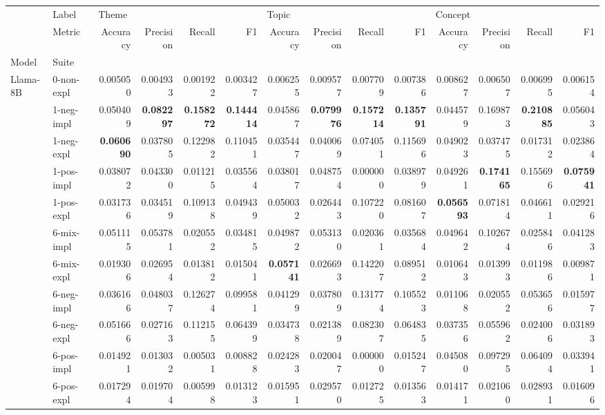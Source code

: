 \begin{tabular}{ll|rrrr|rrrr|rrrr}
 & Label & \multicolumn{4}{l}{Theme} & \multicolumn{4}{l}{Topic} & \multicolumn{4}{l}{Concept} \\
 & Metric & Accuracy & Precision & Recall & F1 & Accuracy & Precision & Recall & F1 & Accuracy & Precision & Recall & F1 \\
Model & Suite &  &  &  &  &  &  &  &  &  &  &  &  \\
\midrule
\multirow[c]{11}{*}{Llama-8B} & 0-non-expl & 0.005050 & 0.004933 & 0.001922 & 0.003427 & 0.006255 & 0.009577 & 0.007709 & 0.007386 & 0.008627 & 0.006507 & 0.006995 & 0.006154 \\
 & 1-neg-impl & 0.050409 & \bfseries 0.082297 & \bfseries 0.158272 & \bfseries 0.144414 & 0.045867 & \bfseries 0.079976 & \bfseries 0.157214 & \bfseries 0.135791 & 0.044579 & 0.169873 & \bfseries 0.210885 & 0.056043 \\
 & 1-neg-expl & \bfseries 0.060690 & 0.037805 & 0.122982 & 0.110451 & 0.035447 & 0.040069 & 0.074051 & 0.115696 & 0.049023 & 0.037475 & 0.017312 & 0.023864 \\
 & 1-pos-impl & 0.038072 & 0.043300 & 0.011215 & 0.035564 & 0.038017 & 0.048754 & 0.000000 & 0.038979 & 0.049261 & \bfseries 0.174165 & 0.155696 & \bfseries 0.075941 \\
 & 1-pos-expl & 0.031736 & 0.034519 & 0.109138 & 0.049439 & 0.050032 & 0.026443 & 0.107220 & 0.081607 & \bfseries 0.056593 & 0.071814 & 0.046611 & 0.029216 \\
 & 6-mix-impl & 0.051115 & 0.053781 & 0.020552 & 0.034815 & 0.049872 & 0.053130 & 0.020361 & 0.035684 & 0.049642 & 0.102674 & 0.025846 & 0.041283 \\
 & 6-mix-expl & 0.019306 & 0.026954 & 0.013812 & 0.015041 & \bfseries 0.057141 & 0.026693 & 0.142207 & 0.089512 & 0.010643 & 0.013993 & 0.011986 & 0.009871 \\
 & 6-neg-impl & 0.036166 & 0.048037 & 0.126274 & 0.099581 & 0.041299 & 0.037809 & 0.131774 & 0.105523 & 0.011068 & 0.020552 & 0.053656 & 0.015977 \\
 & 6-neg-expl & 0.051666 & 0.027163 & 0.112155 & 0.064399 & 0.034738 & 0.021389 & 0.082307 & 0.064835 & 0.037356 & 0.055962 & 0.024006 & 0.031893 \\
 & 6-pos-impl & 0.014921 & 0.013032 & 0.005031 & 0.008828 & 0.024283 & 0.020047 & 0.000000 & 0.015247 & 0.045080 & 0.097295 & 0.064094 & 0.033941 \\
 & 6-pos-expl & 0.017294 & 0.019704 & 0.005998 & 0.013123 & 0.015951 & 0.029570 & 0.012725 & 0.013563 & 0.014171 & 0.021060 & 0.028931 & 0.016096 \\

\end{tabular}
